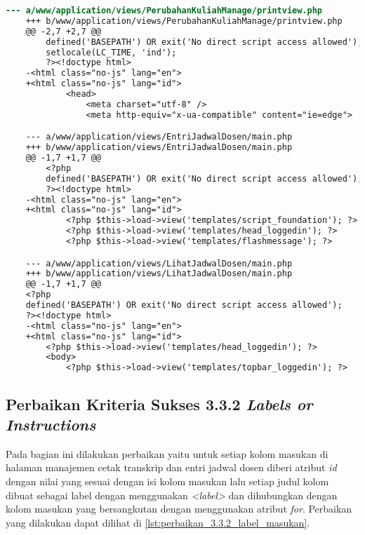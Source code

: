 \begin{lstlisting}[frame=single, label={lst:perbaikan_3.1.1_bahasa_halaman}, language=diff, caption=Perbaikan Kriteria Sukses 3.1.1 - Bahasa yang Tidak Sesuai]
    --- a/www/application/views/PerubahanKuliahManage/printview.php
    +++ b/www/application/views/PerubahanKuliahManage/printview.php
    @@ -2,7 +2,7 @@
        defined('BASEPATH') OR exit('No direct script access allowed');
        setlocale(LC_TIME, 'ind');
        ?><!doctype html>
    -<html class="no-js" lang="en">
    +<html class="no-js" lang="id">
            <head>
                <meta charset="utf-8" />
                <meta http-equiv="x-ua-compatible" content="ie=edge">

    --- a/www/application/views/EntriJadwalDosen/main.php
    +++ b/www/application/views/EntriJadwalDosen/main.php
    @@ -1,7 +1,7 @@
        <?php
        defined('BASEPATH') OR exit('No direct script access allowed');
        ?><!doctype html>
    -<html class="no-js" lang="en">
    +<html class="no-js" lang="id">
            <?php $this->load->view('templates/script_foundation'); ?>
            <?php $this->load->view('templates/head_loggedin'); ?>
            <?php $this->load->view('templates/flashmessage'); ?>

    --- a/www/application/views/LihatJadwalDosen/main.php
    +++ b/www/application/views/LihatJadwalDosen/main.php
    @@ -1,7 +1,7 @@
    <?php
    defined('BASEPATH') OR exit('No direct script access allowed');
    ?><!doctype html>
    -<html class="no-js" lang="en">
    +<html class="no-js" lang="id">
        <?php $this->load->view('templates/head_loggedin'); ?>
        <body>
            <?php $this->load->view('templates/topbar_loggedin'); ?>
\end{lstlisting}

\subsection{Perbaikan Kriteria Sukses 3.3.2 \textit{Labels or Instructions}}
\label{subsec:perbaikan_kriteria_sukses_3.3.2}
Pada bagian ini dilakukan perbaikan yaitu untuk setiap kolom masukan di halaman manajemen cetak transkrip dan entri jadwal dosen diberi atribut \textit{id} dengan nilai yang sesuai dengan isi kolom masukan lalu setiap judul kolom dibuat sebagai label dengan menggunakan \textit{<label>} dan dihubungkan dengan kolom masukan yang bersangkutan dengan menggunakan atribut \textit{for}. Perbaikan yang dilakukan dapat dilihat di \ref{lst:perbaikan_3.3.2_label_masukan}.

